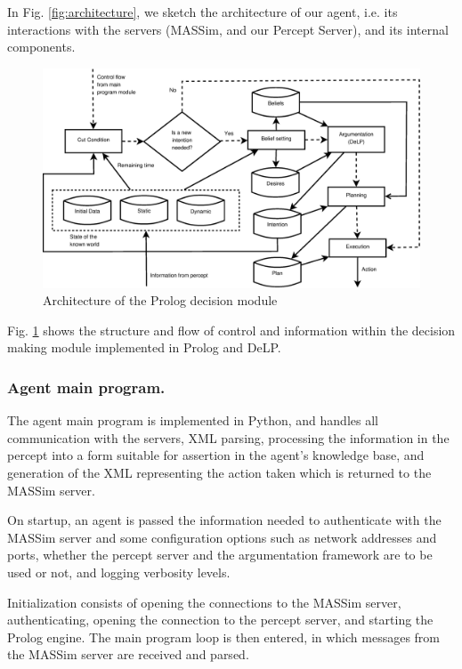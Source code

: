     In Fig. \ref{fig:architecture}, we sketch the architecture of our agent, 
    i.e. its interactions with the servers (MASSim, and our Percept Server), 
    and its internal components.

    \begin{figure}[!htb]
    \centering
    \includegraphics[width=\textwidth]{agentprolog.eps}
    \caption{Architecture of the Prolog decision module}
    \label{fig:prologmodule}
    \end{figure}

    Fig. \ref{fig:prologmodule} shows the structure and flow of control and
    information within the decision making module implemented in Prolog and
    DeLP.
    
\subsubsection{Agent main program.}
    The agent main program is implemented in Python, and handles all
    communication with the servers, XML parsing, processing the information in
    the percept into a form suitable for assertion in the agent's knowledge
    base, and generation of the XML representing the action taken which is
    returned to the MASSim server.

    On startup, an agent is passed the information needed to authenticate with
    the MASSim server and some configuration options such as network addresses
    and ports, whether the percept server and the argumentation framework are to
    be used or not, and logging verbosity levels.

    Initialization consists of opening the connections to the MASSim server,
    authenticating, opening the connection to the percept server, and starting
    the Prolog engine. The main program loop is then entered, in which messages
    from the MASSim server are received and parsed. 

